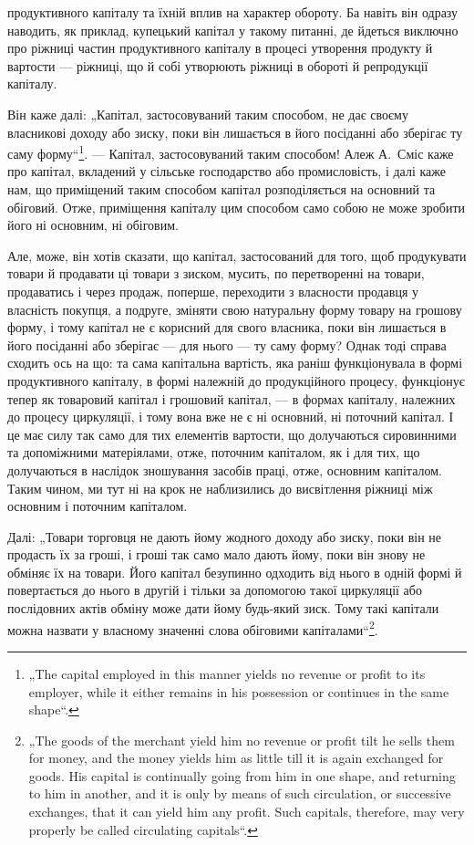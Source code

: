 \parcont{}  %
продуктивного капіталу та їхній вплив на характер обороту. Ба навіть
він одразу наводить, як приклад, купецький капітал у такому питанні,
де йдеться виключно про ріжниці частин продуктивного капіталу
в процесі утворення продукту й вартости — ріжниці, що й собі утворюють
ріжниці в обороті й репродукції капіталу.

Він каже далі: „Капітал, застосовуваний таким способом, не дає своєму
власникові доходу або зиску, поки він лишається в його посіданні або
зберігає ту саму форму“\footnote*{
„The capital employed in this manner yields no revenue or profit to its employer,
while it either remains in his possession or continues in the same shape“.
}. — Капітал, застосовуваний таким способом!
Алеж А.~Сміс каже про капітал, вкладений у сільське господарство або
промисловість, і далі каже нам, що приміщений таким способом капітал
розподіляється на основний та обіговий. Отже, приміщення капіталу цим
способом само собою не може зробити його ні основним, ні обіговим.

Але, може, він хотів сказати, що капітал, застосований для того, щоб
продукувати товари й продавати ці товари з зиском, мусить, по перетворенні
на товари, продаватись і через продаж, поперше, переходити з
власности продавця у власність покупця, а подруге, зміняти свою натуральну
форму товару на грошову форму, і тому капітал не є корисний
для свого власника, поки він лишається в його посіданні або зберігає —
для нього — ту саму форму? Однак тоді справа сходить ось на що: та
сама капітальна вартість, яка раніш функціонувала в формі продуктивного
капіталу, в формі належній до продукційного процесу, функціонує
тепер як товаровий капітал і грошовий капітал, — в формах капіталу, належних
до процесу циркуляції, і тому вона вже не є ні основний, ні поточний
капітал. І це має силу так само для тих елементів вартости, що
долучаються сировинними та допоміжними матеріялами, отже, поточним
капіталом, як і для тих, що долучаються в наслідок зношування засобів
праці, отже, основним капіталом. Таким чином, ми тут ні на крок не
наблизились до висвітлення ріжниці між основним і поточним капіталом.

Далі: „Товари торговця не дають йому жодного доходу або зиску,
поки він не продасть їх за гроші, і гроші так само мало дають йому,
поки він знову не обміняє їх на товари. Його капітал безупинно одходить
від нього в одній формі й повертається до нього в другій і тільки
за допомогою такої циркуляції або послідовних актів обміну може дати
йому будь-який зиск. Тому такі капітали можна назвати у власному значенні
слова обіговими капіталами“\footnote*{
„The goods of the merchant yield him no revenue or profit tilt he sells them
for money, and the money yields him as little till it is again exchanged for goods.
His capital is continually going from him in one shape, and returning to him in
another, and it is only by means of such circulation, or successive exchanges, that
it can yield him any profit. Such capitals, therefore, may very properly be called
circulating capitals“.
}.


